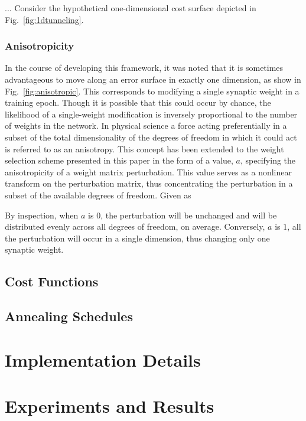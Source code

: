 \documentclass[10pt,journal,cspaper,compsoc]{IEEEtran}
\begin{document}
... Consider the hypothetical one-dimensional cost surface depicted in Fig.~\ref{fig:1dtunneling}. 


\subsubsection{Anisotropicity}
\label{scn:anisotropicity}
In the course of developing this framework, it was noted that it is sometimes advantageous to move along an error surface in exactly one dimension, as show in Fig.~\ref{fig:anisotropic}. This corresponds to modifying a single synaptic weight in a training epoch. Though it is possible that this could occur by chance, the likelihood of a single-weight modification is inversely proportional to the number of weights in the network. In physical science a force acting preferentially in a subset of the total dimensionality of the degrees of freedom in which it could act is referred to as an anisotropy. This concept has been extended to the weight selection scheme presented in this paper in the form of a value, $a$, specifying the anisotropicity of a weight matrix perturbation. This value serves as a nonlinear transform on the perturbation matrix, thus concentrating the perturbation in a subset of the available degrees of freedom. Given as 

By inspection, when $a$ is $0$, the perturbation will be unchanged and will be distributed evenly across all degrees of freedom, on average. Conversely, $a$ is $1$, all the perturbation will occur in a single dimension, thus changing only one synaptic weight.

\subsection{Cost Functions}
\label{scn:cost_functions}


\subsection{Annealing Schedules}
\label{scn:annealing_schedules}

\section{Implementation Details}
\label{scn:implementation_details}


\section{Experiments and Results}
\label{scn:experiments_results}
\end{document}
